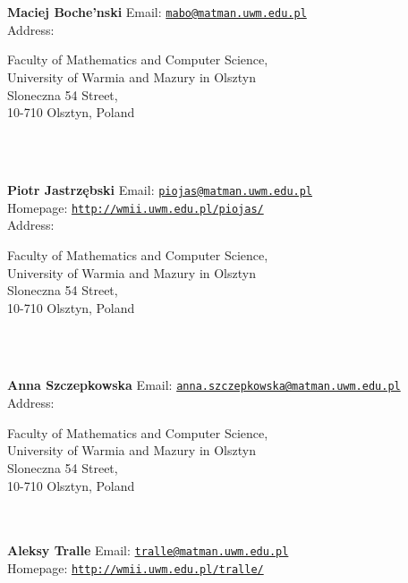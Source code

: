 \documentclass[a4paper,11pt]{report}
\begin{document}
\begin{titlepage}
\mbox{}\\
{\mbox{}\\
\small \noindent \textbf{ Maciej Boche{\a'n}ski   }  Email: \href{mailto://mabo@matman.uwm.edu.pl} {\texttt{mabo@matman.uwm.edu.pl}}\\
  Address: \begin{minipage}[t]{8cm}\noindent
 Faculty of Mathematics and Computer Science,\\
 University of Warmia and Mazury in Olsztyn\\
 Sloneczna 54 Street, \\
 10-710 Olsztyn, Poland \end{minipage}
}\\
{\mbox{}\\
\small \noindent \textbf{ Piotr Jastrz{\k e}bski    }  Email: \href{mailto://piojas@matman.uwm.edu.pl} {\texttt{piojas@matman.uwm.edu.pl}}\\
  Homepage: \href{http://wmii.uwm.edu.pl/~piojas/} {\texttt{http://wmii.uwm.edu.pl/\texttt{}piojas/}}\\
  Address: \begin{minipage}[t]{8cm}\noindent
 Faculty of Mathematics and Computer Science,\\
 University of Warmia and Mazury in Olsztyn\\
 Sloneczna 54 Street, \\
 10-710 Olsztyn, Poland \end{minipage}
}\\
{\mbox{}\\
\small \noindent \textbf{ Anna Szczepkowska   }  Email: \href{mailto://anna.szczepkowska@matman.uwm.edu.pl} {\texttt{anna.szczepkowska@matman.uwm.edu.pl}}\\
  Address: \begin{minipage}[t]{8cm}\noindent
 Faculty of Mathematics and Computer Science,\\
 University of Warmia and Mazury in Olsztyn\\
 Sloneczna 54 Street, \\
 10-710 Olsztyn, Poland \end{minipage}
}\\
{\mbox{}\\
\small \noindent \textbf{ Aleksy Tralle    }  Email: \href{mailto://tralle@matman.uwm.edu.pl} {\texttt{tralle@matman.uwm.edu.pl}}\\
  Homepage: \href{http://wmii.uwm.edu.pl/~tralle/} {\texttt{http://wmii.uwm.edu.pl/\texttt{}tralle/}}\\
}
\end{titlepage}
\end{document}
